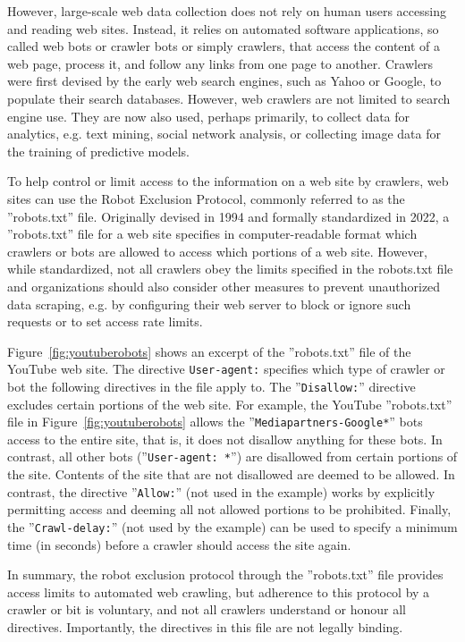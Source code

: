However, large-scale web data collection does not rely on human users accessing and reading web sites. Instead, it relies on automated software applications, so called web bots or crawler bots or simply crawlers, that access the content of a web page, process it, and follow any links from one page to another. Crawlers were first devised by the early web search engines, such as Yahoo or Google, to populate their search databases. However, web crawlers are not limited to search engine use. They are now also used, perhaps primarily, to collect data for analytics, e.g. text mining, social network analysis, or collecting image data for the training of predictive models. 

To help control or limit access to the information on a web site by crawlers, web sites can use the Robot Exclusion Protocol, commonly referred to as the ''robots.txt'' file. Originally devised in 1994 and formally standardized in 2022, a ''robots.txt'' file for a web site specifies in computer-readable format which crawlers or bots are allowed to access which portions of a web site. However, while standardized, not all crawlers obey the limits specified in the robots.txt file and organizations should also consider other measures to prevent unauthorized data scraping, e.g. by configuring their web server to block or ignore such requests or to set access rate limits. 

Figure~\ref{fig:youtuberobots} shows an excerpt of the ''robots.txt'' file of the YouTube web site. The directive \texttt{User-agent:} specifies which type of crawler or bot the following directives in the file apply to. The ''\texttt{Disallow:}'' directive excludes certain portions of the web site. For example, the YouTube ''robots.txt''  file in Figure~\ref{fig:youtuberobots} allows the ''\texttt{Mediapartners-Google*}'' bots access to the entire site, that is, it does not disallow anything for these bots. In contrast, all other bots (''\texttt{User-agent: *}'') are disallowed from certain portions of the site. Contents of the site that are not disallowed are deemed to be allowed. In contrast, the directive ''\texttt{Allow:}'' (not used in the example) works by explicitly permitting access and deeming all not allowed portions to be prohibited. Finally, the ''\texttt{Crawl-delay:}'' (not used by the example) can be used to specify a minimum time (in seconds) before a crawler should access the site again.

In summary, the robot exclusion protocol through the ''robots.txt'' file provides access limits to automated web crawling, but adherence to this protocol by a crawler or bit is voluntary, and not all crawlers understand or honour all directives. Importantly, the directives in this file are not legally binding.

